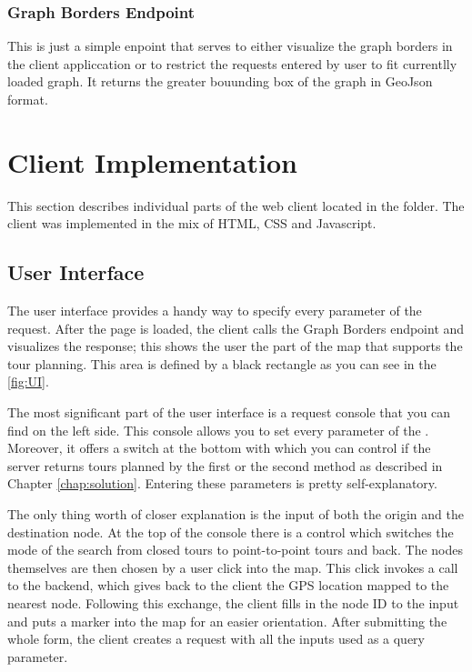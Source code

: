 \documentclass{ctuthesis}
\begin{document}
\subsubsection{Graph Borders Endpoint
   \\ {}
   }
This is just a simple enpoint that serves to either visualize the graph borders in the client appliccation or to restrict the requests entered by user to fit currentlly loaded graph.  It returns the greater bouunding box of the graph in GeoJson format. 


\section{Client Implementation} \label{sec:client}
This section describes individual parts of the web client located in the  folder. The client was implemented in the mix of HTML, CSS and Javascript. \par

\subsection{User Interface}
The user interface provides a handy way to specify every parameter of the request. After the page is loaded, the client calls the Graph Borders endpoint and visualizes the response; this shows the user the part of the map that supports the tour planning. This area is defined by a black rectangle as you can see in the \ref{fig:UI}.\par The most significant part of the user interface is a request console that you can find on the left side. This console allows you to set every parameter of the . Moreover, it offers a switch at the bottom with which you can control if the server returns tours planned by the first or the second method as described in Chapter \ref{chap:solution}. Entering these parameters is pretty self-explanatory. \par The only thing worth of closer explanation is the input of both the origin and the destination node. At the top of the console there is a control which switches the mode of the search from closed tours to point-to-point tours and back. The nodes themselves are then chosen by a user click into the map. This click invokes a call to the backend, which gives back to the client the GPS location mapped to the nearest node. Following this exchange, the client fills in the node ID to the input and puts a marker into the map for an easier orientation. After submitting the whole form, the client creates a request with all the inputs used as a query parameter.
\end{document}
